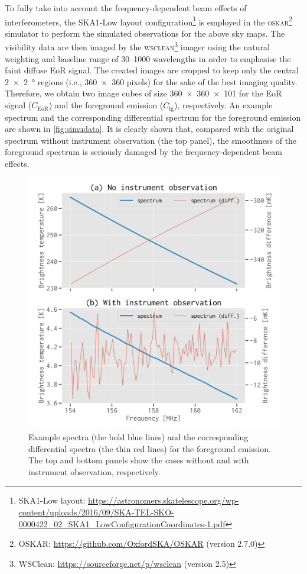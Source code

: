 \documentclass[letters,fleqn,usenatbib,onecolumn]{mnras}
\newcommand{\R}[1]{\mathrm{#1}}
\begin{document}
To fully take into account the frequency-dependent beam effects of
interferometers, the SKA1-Low layout configuration\footnote{%
  SKA1-Low layout:
  \url{https://astronomers.skatelescope.org/wp-content/uploads/2016/09/SKA-TEL-SKO-0000422_02_SKA1_LowConfigurationCoordinates-1.pdf}}
is employed in the \textsc{oskar}\footnote{%
  OSKAR: \url{https://github.com/OxfordSKA/OSKAR} (version 2.7.0)}
simulator \citep{mort2010} to perform the simulated observations for the
above sky maps.
The visibility data are then imaged by the \textsc{wsclean}\footnote{%
  WSClean: \url{https://sourceforge.net/p/wsclean} (version 2.5)}
imager \citep{offringa2014} using the natural weighting and baseline
range of \numrange{30}{1000} wavelengths in order to emphasise the
faint diffuse EoR signal.
The created images are cropped to keep only the central
\SI{2 x 2}{\degree} regions (i.e., \num{360 x 360} pixels) for the sake
of the best imaging quality.
Therefore, we obtain two image cubes of size \num{360 x 360 x 101}
for the EoR signal ($C_{\R{EoR}}$) and the foreground emission
($C_{\R{fg}}$), respectively.
An example spectrum and the corresponding differential spectrum for
the foreground emission are shown in \autoref{fig:simudata}.
It is clearly shown that, compared with the original spectrum without
instrument observation (the top panel), the smoothness of the foreground
spectrum is seriously damaged by the frequency-dependent beam effects.

\begin{figure}
  \centering
  \includegraphics[width=\myfigwidth]{simudata}
  \caption{\label{fig:simudata}%
    Example spectra (the bold blue lines) and the corresponding
    differential spectra (the thin red lines) for the foreground
    emission.
    The top and bottom panels show the cases without and with
    instrument observation, respectively.
  }
\end{figure}
\end{document}
